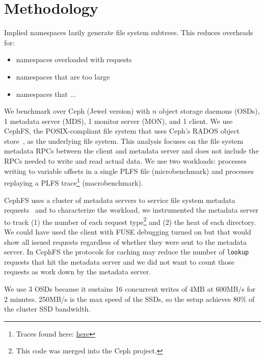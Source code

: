 \section{Methodology}

Implied namespaces lazily generate file system subtrees. This reduces overheads for:
\begin{itemize}
  \item namespaces overloaded with requests
  \item namespaces that are too large
  \item namespaces that ...
\end{itemize}

We benchmark over Ceph (Jewel version) with \(n\) object storage daemons
(OSDs), 1 metadata server (MDS), 1 monitor server (MON), and 1 client.  We use
CephFS, the POSIX-compliant file system that uses Ceph's RADOS object
store~\cite{weil:osdi2006-ceph}, as the underlying file system.  This analysis
focuses on the file system metadata RPCs between the client and metadata server
and does not include the RPCs needed to write and read actual data.  We use two
workloads: processes writing to variable offsets in a single PLFS file
(microbenchmark) and processes replaying a PLFS trace\footnote{Traces found
here:
\href{https://web.archive.org/web/20140419194914/http://institutes.lanl.gov/plfs/maps/}{here}}
(macrobenchmark). 

CephFS uses a cluster of metadata servers to service file system metadata
requests~\cite{weil:sc2004-dyn-metadata} and to characterize the workload, we
instrumented the metadata server to track (1) the number of each request
type\footnote{This code was merged into the Ceph project.} and (2) the heat of
each directory.  We could have used the client with FUSE debugging turned on
but that would show all issued requests regardless of whether they were sent to
the metadata server. In CephFS the protocols for caching may reduce the number
of \texttt{lookup} requests that hit the metadata server and we did not want to
count those requests as work down by the metadata server.

We use 3 OSDs because it sustains 16 concurrent writes of 4MB at 600MB/s for 2
minutes. 250MB/s is the max speed of the SSDs, so the setup achieves 80\% of
the cluster SSD bandwidth.



